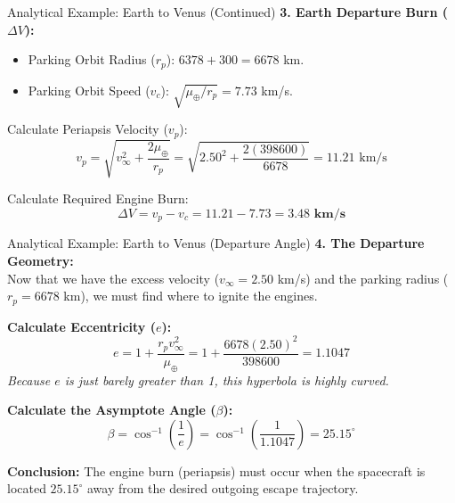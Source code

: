 \documentclass[11pt]{beamer}
\begin{document}
\begin{frame}{Analytical Example: Earth to Venus (Continued)}
    \textbf{3. Earth Departure Burn ($\Delta V$):}
    \begin{itemize}
        \item Parking Orbit Radius ($r_p$): $6378 + 300 = 6678$ km.
        \item Parking Orbit Speed ($v_c$): $\sqrt{\mu_\oplus / r_p} = 7.73$ km/s.
    \end{itemize}
    
    Calculate Periapsis Velocity ($v_p$):
    \begin{equation*}
        v_p = \sqrt{v_\infty^2 + \frac{2\mu_\oplus}{r_p}} = \sqrt{2.50^2 + \frac{2(398600)}{6678}} = 11.21 \text{ km/s}
    \end{equation*}
    
    Calculate Required Engine Burn:
    \begin{equation*}
        \Delta V = v_p - v_c = 11.21 - 7.73 = \mathbf{3.48 \text{ km/s}}
    \end{equation*}
\end{frame}

\begin{frame}{Analytical Example: Earth to Venus (Departure Angle)}
    \textbf{4. The Departure Geometry:} \\
    Now that we have the excess velocity ($v_\infty = 2.50$ km/s) and the parking radius ($r_p = 6678$ km), we must find where to ignite the engines.
    
    \vspace{0.3cm}
    \textbf{Calculate Eccentricity ($e$):}
    \begin{equation*}
        e = 1 + \frac{r_p v_\infty^2}{\mu_\oplus} = 1 + \frac{6678 (2.50)^2}{398600} = \mathbf{1.1047}
    \end{equation*}
    \textit{Because $e$ is just barely greater than 1, this hyperbola is highly curved.}
    
    \vspace{0.3cm}
    \textbf{Calculate the Asymptote Angle ($\beta$):}
    \begin{equation*}
        \beta = \cos^{-1}\left(\frac{1}{e}\right) = \cos^{-1}\left(\frac{1}{1.1047}\right) = \mathbf{25.15^\circ}
    \end{equation*}
    
    \vspace{0.2cm}
    \textbf{Conclusion:} The engine burn (periapsis) must occur when the spacecraft is located $25.15^\circ$ away from the desired outgoing escape trajectory.
\end{frame}
\end{document}
